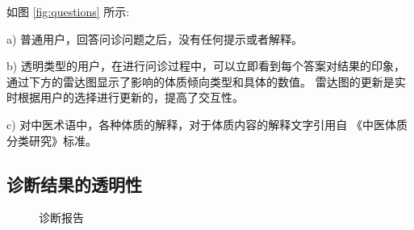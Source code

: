 如图 \ref{fig:questions} 所示:

a) 普通用户，回答问诊问题之后，没有任何提示或者解释。

b) 透明类型的用户，在进行问诊过程中，可以立即看到每个答案对结果的印象，通过下方的雷达图显示了影响的体质倾向类型和具体的数值。
雷达图的更新是实时根据用户的选择进行更新的，提高了交互性。

c) 对中医术语中，各种体质的解释，对于体质内容的解释文字引用自 《中医体质分类研究》标准。



\subsection{诊断结果的透明性}
\begin{figure}[ht]
    \centering
    \caption{诊断报告}
    \label{fig:my_label}
\end{figure}

